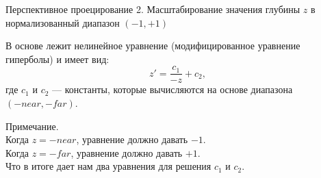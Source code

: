 \documentclass{beamer}
\begin{document}
	\begin{frame}{Перспективное проецирование}
		2. Масштабирование значения глубины $z$ в нормализованный диапазон $(-1, +1)$
		
В основе лежит нелинейное уравнение (модифицированное уравнение гиперболы) и имеет вид: 
\[
	z' = \frac{c_1}{-z} + c_2, 
\]
где $c_1$ и $c_2$ --- константы, которые вычисляются на основе диапазона $(-near, -far)$. 

\vspace{0.5cm}
Примечание.\\
Когда $z = -near$, уравнение должно давать $-1$. \\
Когда $z = -far$, уравнение должно давать $+1$. \\
Что в итоге дает нам два уравнения для решения $c_1$ и $c_2$.

\end{frame}
\end{document}
